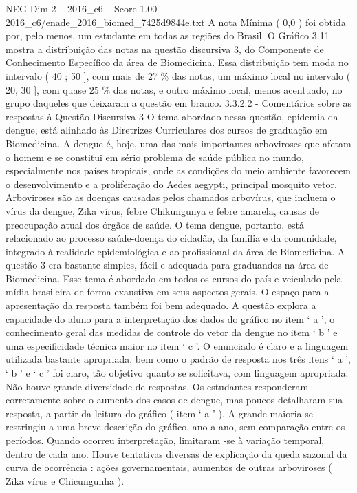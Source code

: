 \begin{textsample}{NEG Dim 2 – 2016\_c6 – Score 1.00 – 2016\_c6/enade\_2016\_biomed\_7425d9844e.txt}
A nota Mínima ( 0,0 ) foi obtida por, pelo menos, um estudante em todas as regiões do Brasil.
O Gráfico 3.11 mostra a distribuição das notas na questão discursiva 3, do Componente de Conhecimento Específico da área de Biomedicina.
Essa distribuição tem moda no intervalo ( 40 ; 50 ], com mais de 27 \% das notas, um máximo local no intervalo ( 20, 30 ], com quase 25 \% das notas, e outro máximo local, menos acentuado, no grupo daqueles que deixaram a questão em branco. 3.3.2.2 - Comentários sobre as respostas à Questão Discursiva 3 O tema abordado nessa questão, epidemia da dengue, está alinhado às Diretrizes Curriculares dos cursos de graduação em Biomedicina.
A dengue é, hoje, uma das mais importantes arboviroses que afetam o homem e se constitui em sério problema de saúde pública no mundo, especialmente nos países tropicais, onde as condições do meio ambiente favorecem o desenvolvimento e a proliferação do Aedes aegypti, principal mosquito vetor.
Arboviroses são as doenças causadas pelos chamados arbovírus, que incluem o vírus da dengue, Zika vírus, febre Chikungunya e febre amarela, causas de preocupação atual dos órgãos de saúde.
O tema dengue, portanto, está relacionado ao processo saúde-doença do cidadão, da família e da comunidade, integrado à realidade epidemiológica e ao profissional da área de Biomedicina.
A questão 3 era bastante simples, fácil e adequada para graduandos na área de Biomedicina.
Esse tema é abordado em todos os cursos do país e veiculado pela mídia brasileira de forma exaustiva em seus aspectos gerais.
O espaço para a apresentação da resposta também foi bem adequado.
A questão explora a capacidade do aluno para a interpretação dos dados do gráfico no item ‘ a ’, o conhecimento geral das medidas de controle do vetor da dengue no item ‘ b ’ e uma especificidade técnica maior no item ‘ c ’.
O enunciado é claro e a linguagem utilizada bastante apropriada, bem como o padrão de resposta nos três itens ‘ a ’, ‘ b ’ e ‘ c ’ foi claro, tão objetivo quanto se solicitava, com linguagem apropriada.
Não houve grande diversidade de respostas.
Os estudantes responderam corretamente sobre o aumento dos casos de dengue, mas poucos detalharam sua resposta, a partir da leitura do gráfico ( item ‘ a ’ ).
A grande maioria se restringiu a uma breve descrição do gráfico, ano a ano, sem comparação entre os períodos.
Quando ocorreu interpretação, limitaram -se à variação temporal, dentro de cada ano.
Houve tentativas diversas de explicação da queda sazonal da curva de ocorrência : ações governamentais, aumentos de outras arboviroses ( Zika vírus e Chicungunha ).

\end{textsample}
